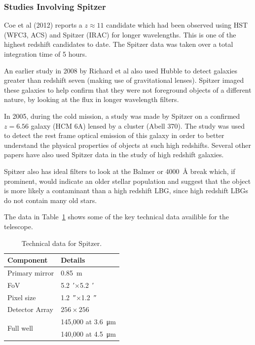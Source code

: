     \subsubsection{Studies Involving Spitzer} %
	\label{ssub:studies_involving_spitzer}
		Coe et al (2012)\cite{0004-637X-762-1-32} reports a $z\approx11$ candidate which had been observed using HST (WFC3, ACS) and Spitzer (IRAC) for longer wavelengths. This is one of the highest redshift candidates to date. The Spitzer data was taken over a total integration time of 5 hours.

		An earlier study in 2008 by Richard et al also used Hubble to detect galaxies greater than redshift seven (making use of gravitational lenses). Spitzer imaged these galaxies to help confirm that they were not foreground objects of a different nature, by looking at the flux in longer wavelength filters\cite{0004-637X-685-2-705}.

		In 2005, during the cold mission, a study was made by Spitzer on a confirmed $z=6.56$ galaxy (HCM 6A) lensed by a cluster (Abell 370). The study was used to detect the rest frame optical emission of this galaxy in order to better understand the physical properties of objects at such high redshifts\cite{1538-4357-635-1-L5}. Several other papers have also used Spitzer data in the study of high redshift galaxies.

		Spitzer also has ideal filters to look at the Balmer or \SI{4000}{\angstrom} break which, if prominent, would indicate an older stellar population and suggest that the object is more likely a contaminant than a high redshift LBG, since high redshift LBGs do not contain many old stars.

		The data in Table~\ref{tab:Spitzer_technical} shows some of the key technical data availible for the telescope.
		\begin{table}[htbp]
			\begin{center}
				\begin{tabular}{l|l}
					Component   &   Details \\
					\hline\hline
					Primary mirror & \SI{0.85}{\metre} \\
					FoV & \SI{5.2}{\arcminute}$\times$\SI{5.2}{\arcminute} \\
					Pixel size & \SI{1.2}{\arcsecond}$\times$\SI{1.2}{\arcsecond} \\
					Detector Array & $256\times256$\,\si{\pixel} \\
					\multirow{2}{*}{Full well} & 145,000 at \SI{3.6}{\micro\metre} \\
							& 140,000 at \SI{4.5}{\micro\metre} \\
				\end{tabular}
			\end{center}
			\caption{Technical data for Spitzer\cite{Spitzer_Heritage_Archive_Documentation}.\label{tab:Spitzer_technical}}
		\end{table}
